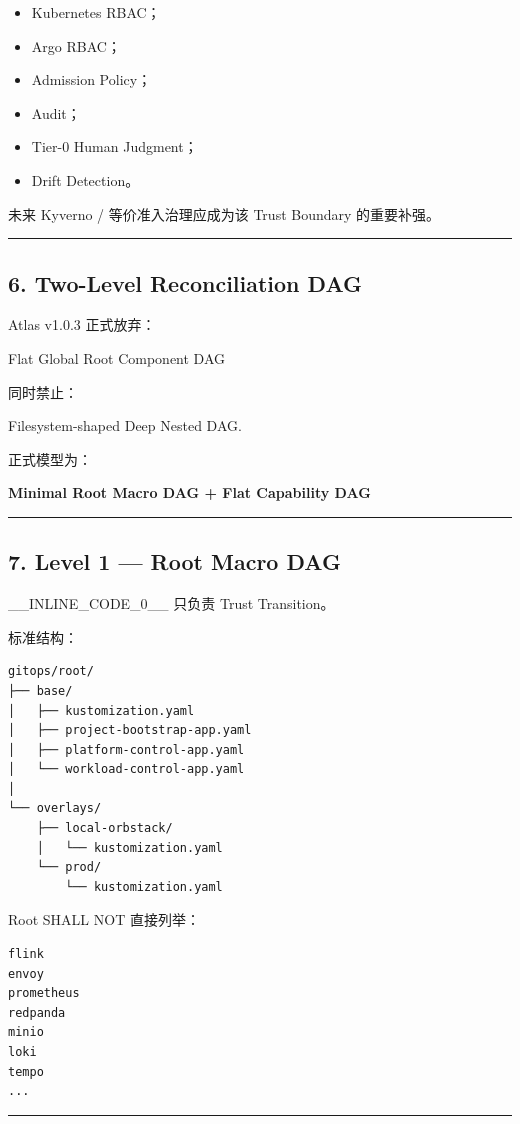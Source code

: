 \documentclass[11pt,a4paper]{article}
\begin{document}
\begin{itemize}
  \item Kubernetes RBAC；
  \item Argo RBAC；
  \item Admission Policy；
  \item Audit；
  \item Tier-0 Human Judgment；
  \item Drift Detection。
\end{itemize}
未来 Kyverno / 等价准入治理应成为该 Trust Boundary 的重要补强。

\vspace{0.5em}\hrule\vspace{0.5em}
\subsection{6. Two-Level Reconciliation DAG}
Atlas v1.0.3 正式放弃：

\begin{gfmBlockquote}
Flat Global Root Component DAG
\end{gfmBlockquote}
同时禁止：

\begin{gfmBlockquote}
Filesystem-shaped Deep Nested DAG.
\end{gfmBlockquote}
正式模型为：

\begin{gfmBlockquote}
\textbf{Minimal Root Macro DAG + Flat Capability DAG}
\end{gfmBlockquote}
\vspace{0.5em}\hrule\vspace{0.5em}
\subsection{7. Level 1 — Root Macro DAG}
\_\_INLINE\_CODE\_0\_\_ 只负责 Trust Transition。

标准结构：

\begin{lstlisting}[language=text]
gitops/root/
├── base/
│   ├── kustomization.yaml
│   ├── project-bootstrap-app.yaml
│   ├── platform-control-app.yaml
│   └── workload-control-app.yaml
│
└── overlays/
    ├── local-orbstack/
    │   └── kustomization.yaml
    └── prod/
        └── kustomization.yaml
\end{lstlisting}
Root SHALL NOT 直接列举：

\begin{lstlisting}[language=text]
flink
envoy
prometheus
redpanda
minio
loki
tempo
...
\end{lstlisting}
\vspace{0.5em}\hrule\vspace{0.5em}
\end{document}
